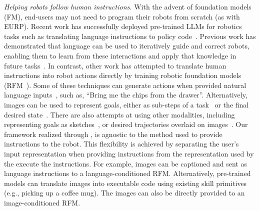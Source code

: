 \emph{Helping robots follow human instructions.} With the advent of foundation models (FM), end-users may not need to program their robots from scratch (as with EURP). Recent work has successfully deployed pre-trained LLMs for robotics tasks such as translating language instructions to policy code~\cite{liang2023code, singh2023progprompt, liu2024ok, mahadevan2024generative}. Previous work has demonstrated that language can be used to iteratively guide and correct robots, enabling them to learn from these interactions and apply that knowledge in future tasks~\cite{zha2023distilling, liang2024learning}. In contrast, other work has attempted to translate human instructions into robot actions directly by training robotic foundation models (RFM~\cite{kawaharazuka2024real}). Some of these techniques can generate actions when provided natural language inputs~\cite{driess2023palm, kim2024openvla}, such as, ``Bring me the chips from the drawer''. Alternatively, images can be used to represent goals, either as sub-steps of a task~\cite{black2023zero, nair2020contextual} or the final desired state~\cite{team2024octo, kapelyukh2023dall}. There are also attempts at using other modalities, including representing goals as sketches~\cite{sundaresan2024rt}, or desired trajectories overlaid on images~\cite{gu2023rt}. Our framework realized through \projname, is agnostic to the method used to provide instructions to the robot. This flexibility is achieved by separating the user's input representation when providing instructions from the representation used by the execute the instructions. For example, images can be captioned and sent as language instructions to a language-conditioned RFM. Alternatively, pre-trained models can translate images into executable code using existing skill primitives (e.g., picking up a coffee mug). The images can also be directly provided to an image-conditioned RFM.



